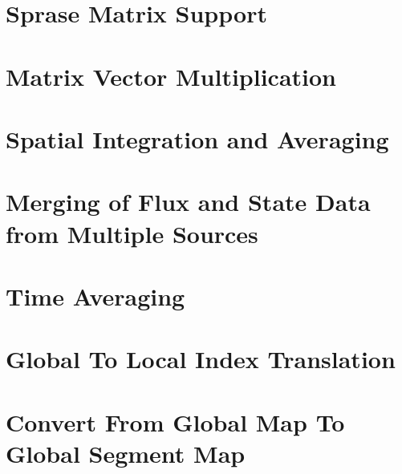 \documentclass{article}
\begin{document}
\section{Sprase Matrix Support}

\vspace*{\fill}
\newpage
%

\vspace*{\fill}
\newpage
%

\vspace*{\fill}
\newpage
%

\vspace*{\fill}
\newpage
%

\vspace*{\fill}
\newpage
%
%
\section{Matrix Vector Multiplication}

\vspace*{\fill}
\newpage
%
\section{Spatial Integration and Averaging}

\vspace*{\fill}
\newpage

\vspace*{\fill}
\newpage
%
\section{Merging of Flux and State Data from Multiple Sources}

\vspace*{\fill}
\newpage
%
\section{Time Averaging}

\vspace*{\fill}
\newpage
%

\vspace*{\fill}
\newpage
%
\section{Global To Local Index Translation}

\vspace*{\fill}
\newpage
%
\section{Convert From Global Map To Global Segment Map}

\vspace*{\fill}
\newpage
\end{document}

